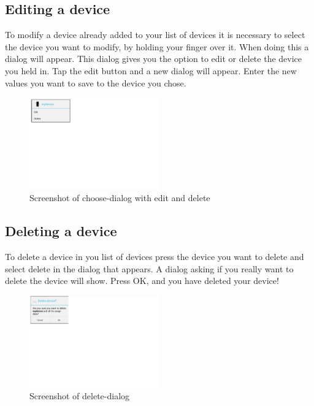 
\subsection{Editing a device}
To modify a device already added to your list of devices it is necessary to select the device you want to modify, by holding your finger over it. When doing this a dialog will appear. This dialog gives you the option to edit or delete the device you held in. Tap the edit button and a new dialog will appear. Enter the new values you want to save to the device you chose.

\begin{figure}[H]
\centering
\includegraphics[width=0.5\textwidth, clip, trim=0cm 15cm 20cm 0cm]{appendix/usermanual/fig/EditDeviceDialog.png}
\caption{Screenshot of choose-dialog with edit and delete}
\end{figure}

\subsection{Deleting a device}
To delete a device in you list of devices press the device you want to delete and select delete in the dialog that appears. A dialog asking if you really want to delete the device will show. Press OK, and you have deleted your device!

\begin{figure}[H]
\centering
\includegraphics[width=0.5\textwidth, clip, trim=0cm 14cm 20cm 0cm]{appendix/usermanual/fig/ReallyDeleteDevice.png}
\caption{Screenshot of delete-dialog}
\end{figure}


